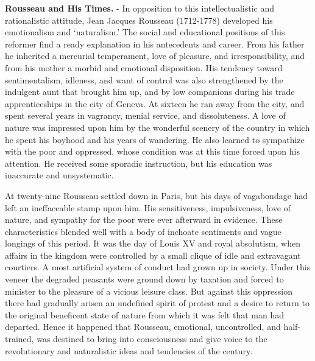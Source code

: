 \documentclass[
]{book}
\begin{document}
\textbf{Rousseau and His Times.} - In opposition to this intellectualistic and rationalistic attitude, Jean Jacques Rousseau (1712-1778) developed his emotionalism and `naturalism.' The social and educational positions of this reformer find a ready explanation in his antecedents and career. From his father he inherited a mercurial temperament, love of pleasure, and irresponsibility, and from his mother a morbid and emotional disposition. His tendency toward sentimentalism, idleness, and want of control was also strengthened by the indulgent aunt that brought him up, and by low companions during his trade apprenticeships in the city of Geneva. At sixteen he ran away from the city, and spent several years in vagrancy, menial service, and dissoluteness. A love of nature was impressed upon him by the wonderful scenery of the country in which he spent his boyhood and his years of wandering. He also learned to sympathize with the poor and oppressed, whose condition was at this time forced upon his attention. He received some sporadic instruction, but his education was inaccurate and unsystematic.

At twenty-nine Rousseau settled down in Paris, but his days of vagabondage had left an ineffaceable stamp upon him. His sensitiveness, impulsiveness, love of nature, and sympathy for the poor were ever afterward in evidence. These characteristics blended well with a body of inchoate sentiments and vague longings of this period. It was the day of Louis XV and royal absolutism, when affairs in the kingdom were controlled by a small clique of idle and extravagant courtiers. A most artificial system of conduct had grown up in society. Under this veneer the degraded peasants were ground down by taxation and forced to minister to the pleasure of a vicious leisure class. But against this oppression there had gradually arisen an undefined spirit of protest and a desire to return to the original beneficent state of nature from which it was felt that man had departed. Hence it happened that Rousseau, emotional, uncontrolled, and half-trained, was destined to bring into consciousness and give voice to the revolutionary and naturalistic ideas and tendencies of the century.
\end{document}
